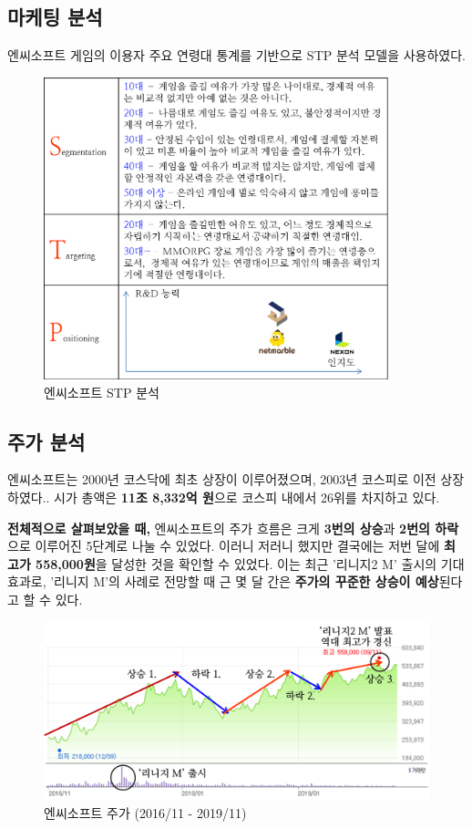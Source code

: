 \documentclass[11pt]{oblivoir}
\begin{document}
		\subsection{마케팅 분석}
		엔씨소프트 게임의 이용자 주요 연령대 통계를 기반으로 STP 분석 모델을 사용하였다.
		\begin{figure}[htbp]
			\centering
			\includegraphics[width=0.9\textwidth]{Pictures/STP.png}
			\caption{엔씨소프트 STP 분석}
		\end{figure}
		
		\subsection{주가 분석}
		엔씨소프트는 2000년 코스닥에 최초 상장이 이루어졌으며, 2003년 코스피로 이전 상장 하였다.. 시가 총액은 \textbf{11조 8,332억 원}으로 코스피 내에서 26위를 차지하고 있다. 
		
		\textbf{전체적으로 살펴보았을 때,} 엔씨소프트의 주가 흐름은 크게 \textbf{3번의 상승}과 \textbf{2번의 하락}으로 이루어진 5단계로 나눌 수 있었다. 이러니 저러니 했지만 결국에는 저번 달에 \textbf{최고가 558,000원}을 달성한 것을 확인할 수 있었다. 이는 최근 '리니지2 M' 출시의 기대 효과로, '리니지 M'의 사례로 전망할 때 근 몇 달 간은 \textbf{주가의 꾸준한 상승이 예상}된다고 할 수 있다.
		
		\pagebreak
		
		\begin{figure}[htbp]
			\centering
			\includegraphics[width=1\textwidth]{Pictures/stock.png}
			\caption{엔씨소프트 주가 (2016/11 - 2019/11)}
		\end{figure}
		
\end{document}
